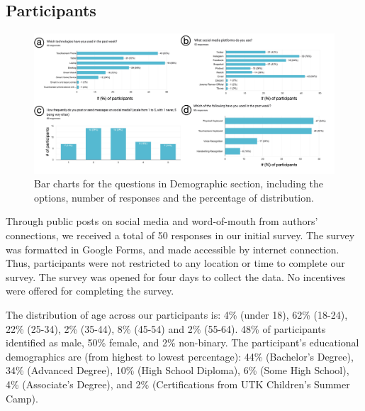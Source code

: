 \documentclass[acmsmall,screen,authorversion,nonacm]{acmart}
\begin{document}
\subsection{Participants}\label{demo_section}

\begin{figure}[h]
\begin{center}
\includegraphics[width=1.0\linewidth]{figures/demographic.jpg}
\vspace{-1.5pc}
\caption{Bar charts for the questions in Demographic section, including the options, number of responses and the percentage of distribution.}
\label{fig:demographic}
\vspace{-1pc}
\Description{}
\end{center}
\end{figure}

Through public posts on social media and word-of-mouth from authors' connections, we received a total of 50 responses in our initial survey. The survey was formatted in Google Forms, and made accessible by internet connection. Thus, participants were not restricted to any location or time to complete our survey. The survey was opened for four days to collect the data. No incentives were offered for completing the survey. 

The distribution of age across our participants is: 4\% (under 18), 62\% (18-24), 22\% (25-34),  2\% (35-44), 8\% (45-54) and 2\% (55-64). 48\% of participants identified as male, 50\% female, and 2\% non-binary. The participant's educational demographics are (from highest to lowest percentage): 44\% (Bachelor's Degree), 34\% (Advanced Degree), 10\% (High School Diploma), 6\% (Some High School), 4\% (Associate's Degree), and 2\% (Certifications from UTK Children's Summer Camp).  
\end{document}
